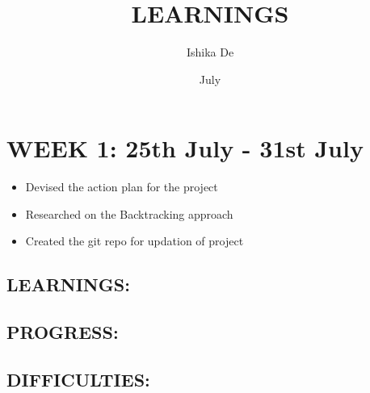 \documentclass{article}
\title{LEARNINGS}
\author{Ishika De}
\date{July}
\begin{document}
\maketitle

\section{WEEK 1: 25th July - 31st July}
\begin{itemize}
	\item Devised the action plan for the project
	\item Researched on the Backtracking approach
	\item Created the git repo for updation of project
\end{itemize}

\subsection{LEARNINGS: }
\subsection{PROGRESS: }
\subsection{DIFFICULTIES: }
\end{document}
